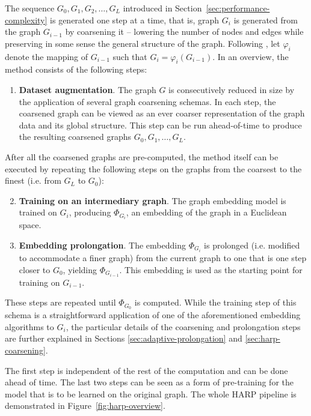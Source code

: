 \documentclass[sn-mathphys,pdflatex,iicol]{sn-jnl}%
\begin{document}
The sequence \( G_0, G_1, G_2, \dots, G_L \) introduced in Section~\ref{sec:performance-complexity} is generated one step at a time, that is, graph \( G_i \) is generated from the graph \( G_{i - 1} \) by coarsening it -- lowering the number of nodes and edges while preserving in some sense the general structure of the graph. Following \cite{chen_harp_2018}, let \( \varphi_i \) denote the mapping of \( G_{i - 1} \) such that \( G_i = \varphi_i \left( G_{i - 1} \right) \). In an overview, the method consists of the following steps:

\begin{enumerate}
  \item \textbf{Dataset augmentation}. The graph \( G \) is consecutively reduced in size by the application of several graph coarsening schemas. In each step, the coarsened graph can be viewed as an ever coarser representation of the graph data and its global structure. This step can be run ahead-of-time to produce the resulting coarsened graphs \( G_0, G_1, \dots, G_L \).
\end{enumerate}
After all the coarsened graphs are pre-computed, the method itself can be executed by repeating the following steps on the graphs from the coarsest to the finest (i.e. from \( G_L \) to \( G_0 \)):
\begin{enumerate}\setcounter{enumi}{1}
  \item \textbf{Training on an intermediary graph}. The graph embedding model is trained on \( G_i \), producing \( \Phi_{G_i} \), an embedding of the graph in a Euclidean space.
  \item \textbf{Embedding prolongation}. The embedding \( \Phi_{G_i} \) is prolonged (i.e. modified to accommodate a finer graph) from the current graph to one that is one step closer to \( G_0 \), yielding \( \Phi_{G_{i - 1}} \). This embedding is used as the starting point for training on \( G_{i - 1} \).
\end{enumerate}
These steps are repeated until \( \Phi_{G_0} \) is computed. While the training step of this schema is a straightforward application of one of the aforementioned embedding algorithms to \( G_i \), the particular details of the coarsening and prolongation steps are further explained in Sections \ref{sec:adaptive-prolongation} and \ref{sec:harp-coarsening}.

The first step is independent of the rest of the computation and can be done ahead of time. The last two steps can be seen as a form of pre-training for the model that is to be learned on the original graph. The whole HARP pipeline is demonstrated in Figure~\ref{fig:harp-overview}.
\end{document}
